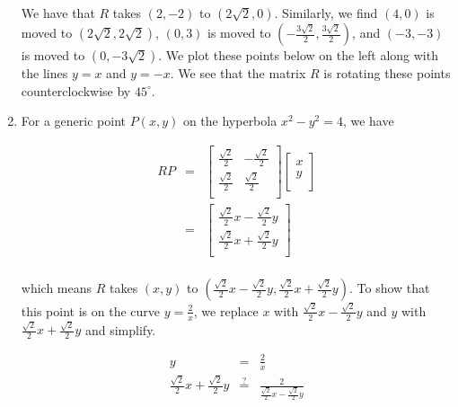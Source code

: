 \documentclass{ximera}
\begin{document}
\begin{ex}
\begin{enumerate}
We have that $R$ takes $(2,-2)$ to $(2 \sqrt{2}, 0)$.  Similarly, we find $(4,0)$ is moved to $(2\sqrt{2}, 2\sqrt{2})$, $(0,3)$ is moved to $\left(-\frac{3 \sqrt{2}}{2},  \frac{3 \sqrt{2}}{2} \right)$, and $(-3,-3)$ is moved to $(0,-3\sqrt{2})$.  We plot these points below on the left along with the lines $y=x$ and $y=-x$. We see that the matrix $R$ is rotating these points counterclockwise by $45^{\circ}$.

\item  For a generic point $P(x,y)$ on the hyperbola $x^2-y^2=4$, we have  

\[\begin{array}{rcl}

RP & = &  \left[ \begin{array}{rr} \frac{\sqrt{2}}{2} & -\frac{\sqrt{2}}{2} \\ [3pt] \frac{\sqrt{2}}{2} & \frac{\sqrt{2}}{2} \\ \end{array} \right]\left[ \begin{array}{r} x \\ [3pt] y \\ \end{array} \right] \\ [13pt]

& = & \left[ \begin{array}{r} \frac{\sqrt{2}}{2} x - \frac{\sqrt{2}}{2} y \\ [3pt] \frac{\sqrt{2}}{2} x + \frac{\sqrt{2}}{2} y \\ \end{array} \right] \\

\end{array}\]

which means $R$ takes $(x,y)$ to $\left(\frac{\sqrt{2}}{2} x - \frac{\sqrt{2}}{2} y, \frac{\sqrt{2}}{2} x + \frac{\sqrt{2}}{2} y\right)$.  To show that this point is on the curve $y = \frac{2}{x}$, we replace $x$ with $\frac{\sqrt{2}}{2} x - \frac{\sqrt{2}}{2} y$ and $y$ with $\frac{\sqrt{2}}{2} x + \frac{\sqrt{2}}{2} y$ and simplify.

\[ \begin{array}{rcl}

y & = & \frac{2}{x} \\

\frac{\sqrt{2}}{2} x + \frac{\sqrt{2}}{2} y & \stackrel{?}{=} & \frac{2}{\frac{\sqrt{2}}{2} x - \frac{\sqrt{2}}{2} y} \\[10pt]


\end{array}\]
\end{enumerate}
\end{ex}
\end{document}
